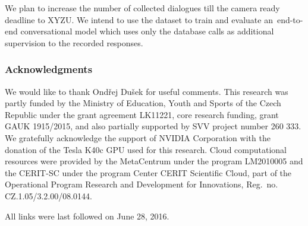 \documentclass[runningheads,a4paper]{llncs}
\newcommand{\commentontext}[2]{\colorbox{yellow!60}{#1}\pdfcomment[color={0.234 0.867 0.211},hoffset=-6pt,voffset=10pt,opacity=0.5]{#2}}
\begin{document}
We plan to increase the number of collected dialogues till the camera ready deadline to XYZU.
We intend to use the dataset to train and evaluate an~end-to-end conversational model which uses only the database calls as additional supervision to the recorded responses. 

\subsubsection*{Acknowledgments}
We would like to thank Ond\v{r}ej Du\v{s}ek for useful comments.
This research was partly funded by the Ministry of Education, Youth and Sports of the Czech Republic under the grant agreement LK11221, core research funding, grant GAUK 1915/2015, and also partially supported by SVV project number 260 333. 
We gratefully acknowledge the support of NVIDIA Corporation with the donation of the Tesla K40c GPU used for this research.
Cloud computational resources were provided by the MetaCentrum under the program LM2010005 and the CERIT-SC under the program Center CERIT Scientific Cloud, part of the Operational Program Research and Development for Innovations, Reg.\ no. CZ.1.05/3.2.00/08.0144.

%
%
%
%
%
%





All links were last followed on June 28, 2016.
\end{document}
